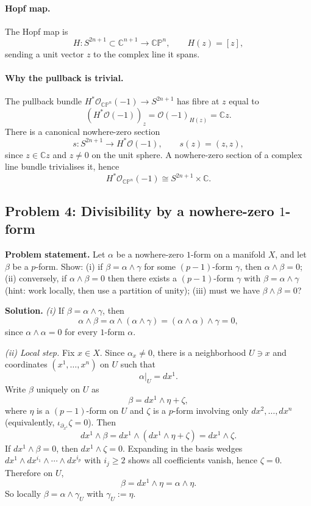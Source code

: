 \documentclass[12pt,a4paper]{article}
\theoremstyle{plain}
\theoremstyle{definition}      %
\begin{document}
	\paragraph{\textbf{Hopf map.}}
	The Hopf map is
	\[
	H:S^{2n+1}\subset \mathbb C^{n+1}\to \mathbb{CP}^n,\qquad H(z)=[z],
	\]
	sending a unit vector $z$ to the complex line it spans.
	
	\paragraph{\textbf{Why the pullback is trivial.}}
	The pullback bundle $H^*\mathcal O_{\mathbb{CP}^n}(-1)\to S^{2n+1}$ has fibre at $z$ equal to
	\[
	(H^*\mathcal O(-1))_z=\mathcal O(-1)_{H(z)}=\mathbb C z.
	\]
	There is a canonical nowhere-zero section
	\[
	s:S^{2n+1}\to H^*\mathcal O(-1),\qquad s(z)=(z,z),
	\]
	since $z\in \mathbb Cz$ and $z\neq 0$ on the unit sphere. A nowhere-zero section of a complex line bundle
	trivialises it, hence
	\[
	H^*\mathcal O_{\mathbb{CP}^n}(-1)\cong S^{2n+1}\times \mathbb C.
	\]
	
	
	
	\subsection*{Problem 4: Divisibility by a nowhere-zero $1$-form}
	
	\noindent \textbf{Problem statement.}
	Let $\alpha$ be a nowhere-zero $1$-form on a manifold $X$, and let $\beta$ be a $p$-form.
	Show:
	(i) if $\beta=\alpha\wedge\gamma$ for some $(p-1)$-form $\gamma$, then $\alpha\wedge\beta=0$;
	(ii) conversely, if $\alpha\wedge\beta=0$ then there exists a $(p-1)$-form $\gamma$ with $\beta=\alpha\wedge\gamma$
	(hint: work locally, then use a partition of unity);
	(iii) must we have $\beta\wedge\beta=0$?
	
	\medskip
	\noindent \textbf{Solution.}
	\textit{(i)} If $\beta=\alpha\wedge\gamma$, then
	\[
	\alpha\wedge\beta=\alpha\wedge(\alpha\wedge\gamma)=(\alpha\wedge\alpha)\wedge\gamma=0,
	\]
	since $\alpha\wedge\alpha=0$ for every $1$-form $\alpha$.
	
	\smallskip
	\textit{(ii) Local step.}
	Fix $x\in X$. Since $\alpha_x\neq 0$, there is a neighborhood $U\ni x$ and coordinates
	$(x^1,\dots,x^n)$ on $U$ such that
	\[
	\alpha|_U=dx^1.
	\]
	Write $\beta$ uniquely on $U$ as
	\[
	\beta = dx^1\wedge \eta + \zeta,
	\]
	where $\eta$ is a $(p-1)$-form on $U$ and $\zeta$ is a $p$-form involving only
	$dx^2,\dots,dx^n$ (equivalently, $\iota_{\partial_{x^1}}\zeta=0$).
	Then
	\[
	dx^1\wedge\beta = dx^1\wedge(dx^1\wedge\eta+\zeta)=dx^1\wedge\zeta.
	\]
	If $dx^1\wedge\beta=0$, then $dx^1\wedge\zeta=0$. Expanding in the basis wedges
	$dx^1\wedge dx^{i_1}\wedge\cdots\wedge dx^{i_p}$ with $i_j\ge 2$ shows all coefficients vanish,
	hence $\zeta=0$. Therefore on $U$,
	\[
	\beta = dx^1\wedge\eta = \alpha\wedge\eta.
	\]
	So locally $\beta=\alpha\wedge\gamma_U$ with $\gamma_U:=\eta$.
	
\end{document}
